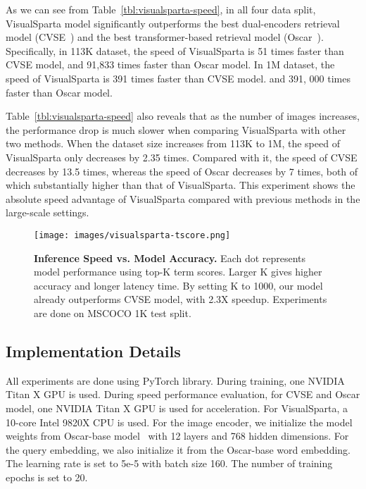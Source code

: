 \documentclass[11pt,a4paper]{article}
\begin{document}
As we can see from Table~\ref{tbl:visualsparta-speed}, in all four data split, VisualSparta model significantly outperforms the best dual-encoders retrieval model (CVSE~\cite{wang2020consensus}) and the best transformer-based retrieval model (Oscar~\cite{li2020oscar}). Specifically, in 113K dataset, the speed of VisualSparta is 51 times faster than CVSE model, and 91,833 times faster than Oscar model. In 1M dataset, the speed of VisualSparta is 391 times faster than CVSE model. and 391, 000 times faster than Oscar model. 

Table~\ref{tbl:visualsparta-speed} also reveals that as the number of images increases, the performance drop is much slower when comparing VisualSparta with other two methods. When the dataset size increases from 113K to 1M, the speed of VisualSparta only decreases by 2.35 times. Compared with it, the speed of CVSE decreases by 13.5 times, whereas the speed of Oscar decreases by 7 times, both of which 
substantially higher than that of VisualSparta. This experiment shows the absolute speed advantage of VisualSparta compared with previous methods in the large-scale settings.

\begin{figure}[!ht]
\centering
\texttt{[image: images/visualsparta-tscore.png]}
\caption{\textbf{Inference Speed vs. Model Accuracy.} Each dot represents model performance using top-K term scores. Larger K gives higher accuracy and longer latency time. By setting K to 1000, our model already outperforms CVSE model, with 2.3X speedup. Experiments are done on MSCOCO 1K test split.} 
\label{fig:visualsparta-tscore}
\end{figure}

\subsection{Implementation Details}
All experiments are done using PyTorch library. During training, one NVIDIA Titan X GPU is used. During speed performance evaluation, for CVSE and Oscar model, one NVIDIA Titan X GPU is used for acceleration. For VisualSparta, a 10-core Intel 9820X CPU is used. For the image encoder, we initialize the model weights from Oscar-base model~\cite{li2020oscar} with 12 layers and 768 hidden dimensions. For the query embedding, we also initialize it from the Oscar-base word embedding. The learning rate is set to 5e-5 with batch size 160. The number of training epochs is set to 20.
\end{document}
